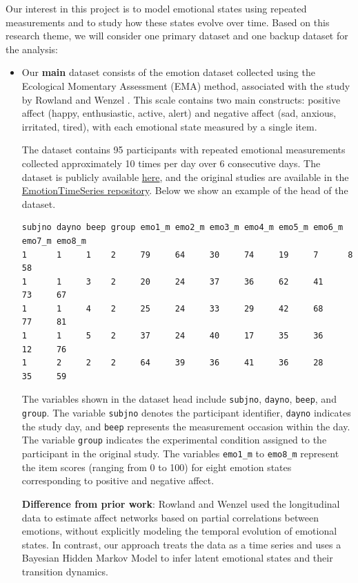 \documentclass[a4paper,11pt]{article}
\begin{document}
Our interest in this project is to model emotional states using repeated measurements and to study how these states evolve over time. Based on this research theme, we will consider one primary dataset and one backup dataset for the analysis:
\begin{itemize}
   \item Our \textbf{main} dataset consists of the emotion dataset collected using the Ecological Momentary Assessment (EMA) method, associated with the study by Rowland and Wenzel \cite{Rowland2020}. This scale contains two main constructs: positive affect (happy, enthusiastic, active, alert) and negative affect (sad, anxious, irritated, tired), with each emotional state measured by a single item.

The dataset contains 95 participants with repeated emotional measurements collected approximately 10 times per day over 6 consecutive days. The dataset is publicly available \href{https://osf.io/jmz2n/files/m5fcy}{here}, and the original studies are available in the \href{https://github.com/jmbh/EmotionTimeSeries}{EmotionTimeSeries repository}. Below we show an example of the head of the dataset.

\begin{verbatim}
subjno dayno beep group emo1_m emo2_m emo3_m emo4_m emo5_m emo6_m emo7_m emo8_m
1      1     1    2     79     64     30     74     19     7      8      58
1      1     3    2     20     24     37     36     62     41     73     67
1      1     4    2     25     24     33     29     42     68     77     81
1      1     5    2     37     24     40     17     35     36     12     76
1      2     2    2     64     39     36     41     36     28     35     59
\end{verbatim}

The variables shown in the dataset head include \texttt{subjno}, \texttt{dayno}, \texttt{beep}, and \texttt{group}. The variable \texttt{subjno} denotes the participant identifier, \texttt{dayno} indicates the study day, and \texttt{beep} represents the measurement occasion within the day. The variable \texttt{group} indicates the experimental condition assigned to the participant in the original study. The variables \texttt{emo1\_m} to \texttt{emo8\_m} represent the item scores (ranging from 0 to 100) for eight emotion states corresponding to positive and negative affect.

\textbf{Difference from prior work}: Rowland and Wenzel \cite{Rowland2020} used the longitudinal data to estimate affect networks based on partial correlations between emotions, without explicitly modeling the temporal evolution of emotional states. In contrast, our approach treats the data as a time series and uses a Bayesian Hidden Markov Model to infer latent emotional states and their transition dynamics.


\end{itemize}
\end{document}
